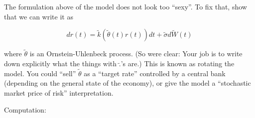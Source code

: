 \documentclass[a4paper]{article}
\begin{document}
The formulation above of the model does not look too ``sexy''. To fix that, show that we can write it as

$$dr\left(t\right)=\tilde{k}\left(\tilde{\theta}\left(t\right)r\left(t\right)\right)dt+\tilde{\sigma}d\tilde{W}\left(t\right)$$

where $\tilde{\theta}$ is an Ornstein-Uhlenbeck process. (So were clear: Your job is to write down explicitly what the things with $\tilde{.}$'s are.) This is known as rotating the model. You could ``sell'' $\tilde{\theta}$ as a ``target rate'' controlled by a central bank (depending on the general state of the economy), or give the model a ``stochastic market price of risk'' interpretation.

\vspace{0.2cm}
Computation:
\end{document}
